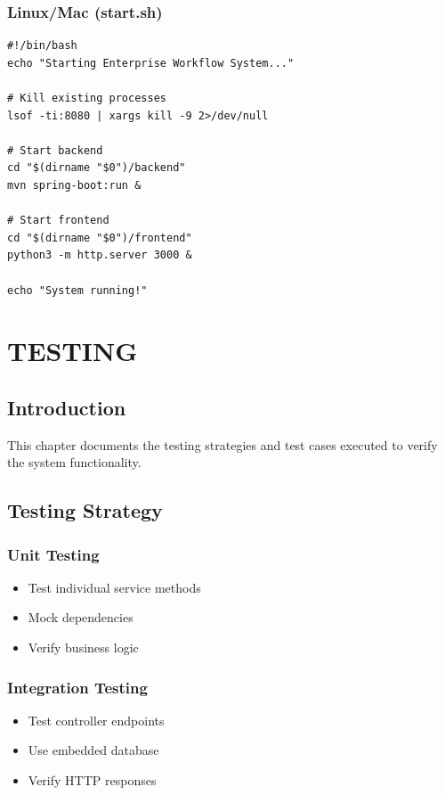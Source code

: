 \documentclass[12pt,a4paper,twoside]{book}
\begin{document}
\subsection{Linux/Mac (start.sh)}

\begin{lstlisting}[style=bash]
#!/bin/bash
echo "Starting Enterprise Workflow System..."

# Kill existing processes
lsof -ti:8080 | xargs kill -9 2>/dev/null

# Start backend
cd "$(dirname "$0")/backend"
mvn spring-boot:run &

# Start frontend
cd "$(dirname "$0")/frontend"
python3 -m http.server 3000 &

echo "System running!"
\end{lstlisting}

\chapter{TESTING}

\section{Introduction}

This chapter documents the testing strategies and test cases executed to verify the system functionality.

\section{Testing Strategy}

\subsection{Unit Testing}
\begin{itemize}
    \item Test individual service methods
    \item Mock dependencies
    \item Verify business logic
\end{itemize}

\subsection{Integration Testing}
\begin{itemize}
    \item Test controller endpoints
    \item Use embedded database
    \item Verify HTTP responses
\end{itemize}
\end{document}

